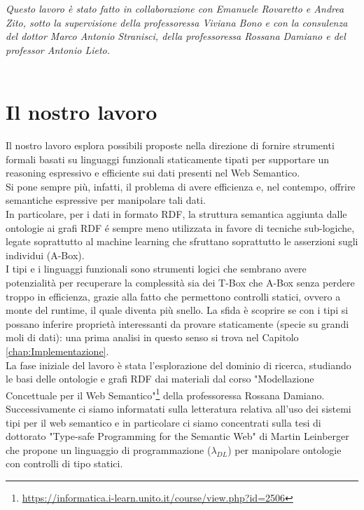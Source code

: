 \textsl{Questo lavoro è stato fatto in collaborazione con Emanuele Rovaretto e Andrea Zito, sotto la supervisione della professoressa Viviana Bono e con la consulenza del dottor Marco Antonio Stranisci, della professoressa Rossana Damiano e del professor Antonio Lieto.}\\\\


\section{Il nostro lavoro}
Il nostro lavoro esplora possibili proposte nella direzione di fornire strumenti formali basati su linguaggi funzionali staticamente tipati per supportare un reasoning
espressivo e efficiente sui dati presenti nel Web Semantico. 
\\Si pone sempre più, infatti, il problema di avere efficienza e, nel contempo, offrire semantiche espressive per manipolare tali dati. 
\\In particolare, per i dati in formato RDF, la struttura semantica aggiunta dalle ontologie ai grafi RDF \'e sempre meno utilizzata
in favore di tecniche sub-logiche, legate soprattutto al machine learning che sfruttano soprattutto le asserzioni sugli individui (A-Box). 
\\I tipi e i linguaggi funzionali sono strumenti logici che sembrano avere potenzialità per recuperare la complessità sia dei T-Box che A-Box senza perdere troppo in efficienza, grazie alla fatto che permettono controlli statici, ovvero a monte del runtime, il quale diventa più snello. La sfida è scoprire se con i tipi si possano inferire proprietà interessanti da provare staticamente (specie su grandi moli di dati): una prima analisi in questo senso si trova nel Capitolo \ref{chap:Implementazione}.
\\La fase iniziale del lavoro è stata l'esplorazione del dominio di ricerca,
studiando le basi delle ontologie e grafi RDF dai materiali dal corso "Modellazione Concettuale per il Web Semantico"\footnote{\url{https://informatica.i-learn.unito.it/course/view.php?id=2506}} 
della professoressa Rossana Damiano.
Successivamente ci siamo informatati sulla letteratura relativa all'uso dei sistemi tipi per il web semantico e in particolare ci siamo concentrati sulla tesi di
dottorato "Type-safe Programming for the Semantic Web"\cite{leinbergerphdthesis} di Martin Leinberger che propone un linguaggio di programmazione ($\lambda_{DL}$) per manipolare ontologie con controlli di tipo statici. 
